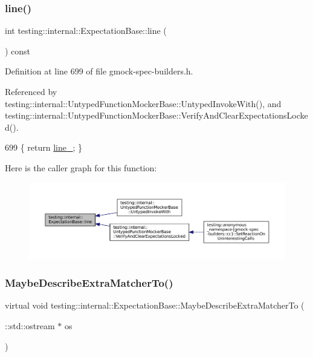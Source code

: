 \subsubsection{\texorpdfstring{line()}{line()}}
{\footnotesize\ttfamily int testing\+::internal\+::\+Expectation\+Base\+::line (\begin{DoxyParamCaption}{ }\end{DoxyParamCaption}) const\hspace{0.3cm}{\ttfamily [inline]}}



Definition at line 699 of file gmock-\/spec-\/builders.\+h.



Referenced by testing\+::internal\+::\+Untyped\+Function\+Mocker\+Base\+::\+Untyped\+Invoke\+With(), and testing\+::internal\+::\+Untyped\+Function\+Mocker\+Base\+::\+Verify\+And\+Clear\+Expectations\+Locked().


\begin{DoxyCode}
699 \{ \textcolor{keywordflow}{return} \hyperlink{classtesting_1_1internal_1_1ExpectationBase_ab8143119e4b686ff1bb6c985924da57a}{line\_}; \}
\end{DoxyCode}
Here is the caller graph for this function\+:
\nopagebreak
\begin{figure}[H]
\begin{center}
\leavevmode
\includegraphics[width=350pt]{classtesting_1_1internal_1_1ExpectationBase_a6a44d831449d31e0e46d0070625b452c_icgraph}
\end{center}
\end{figure}
\mbox{\label{classtesting_1_1internal_1_1ExpectationBase_a5ce4f648c7b112d27b798711d1e3ff5b}} 
\subsubsection{\texorpdfstring{Maybe\+Describe\+Extra\+Matcher\+To()}{MaybeDescribeExtraMatcherTo()}}
{\footnotesize\ttfamily virtual void testing\+::internal\+::\+Expectation\+Base\+::\+Maybe\+Describe\+Extra\+Matcher\+To (\begin{DoxyParamCaption}\item[{\+::std\+::ostream $\ast$}]{os }\end{DoxyParamCaption})\hspace{0.3cm}{\ttfamily [pure virtual]}}




